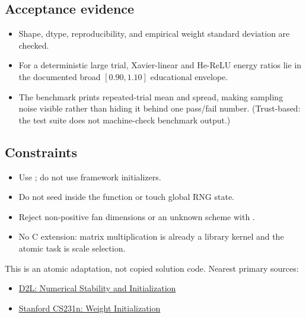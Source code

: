         \subsection{Acceptance evidence}

        \begin{evidencebox}
        \begin{itemize}
          \item Shape, dtype, reproducibility, and empirical weight standard deviation are checked.
  \item For a deterministic large trial, Xavier-linear and He-ReLU energy ratios lie in the documented broad $[0.90,1.10]$ educational envelope.
  \item The benchmark prints repeated-trial mean and spread, making sampling noise visible rather than hiding it behind one pass/fail number. (Trust-based: the test suite does not machine-check benchmark output.)
        \end{itemize}
        \end{evidencebox}

        \subsection{Constraints}

        \begin{itemize}
          \item Use ; do not use framework initializers.
  \item Do not seed inside the function or touch global RNG state.
  \item Reject non-positive fan dimensions or an unknown scheme with .
  \item No C extension: matrix multiplication is already a library kernel and the atomic task is scale selection.
        \end{itemize}

        \begin{sourcebox}
        This is an atomic adaptation, not copied solution code. Nearest primary sources:
        \begin{itemize}
          \item \href{https://d2l.ai/chapter_multilayer-perceptrons/numerical-stability-and-init.html}{D2L: Numerical Stability and Initialization}
  \item \href{https://cs231n.github.io/neural-networks-2/}{Stanford CS231n: Weight Initialization}
        \end{itemize}
        \end{sourcebox}
